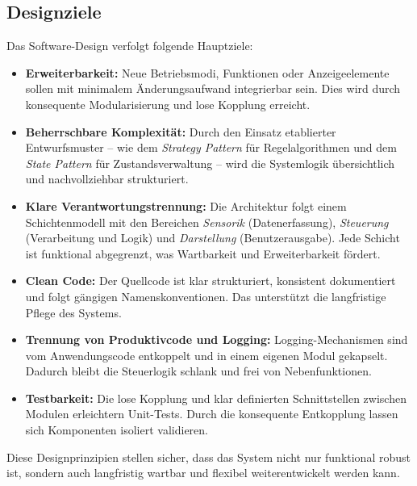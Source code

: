 \documentclass[a4paper,12pt]{article}
\begin{document}
\subsection*{Designziele}

Das Software-Design verfolgt folgende Hauptziele:

\begin{itemize}
    \item \textbf{Erweiterbarkeit:}  
    Neue Betriebsmodi, Funktionen oder Anzeigeelemente sollen mit minimalem Änderungsaufwand integrierbar sein. Dies wird durch konsequente Modularisierung und lose Kopplung erreicht.

    \item \textbf{Beherrschbare Komplexität:}  
    Durch den Einsatz etablierter Entwurfsmuster – wie dem \textit{Strategy Pattern} für Regelalgorithmen und dem \textit{State Pattern} für Zustandsverwaltung – wird die Systemlogik übersichtlich und nachvollziehbar strukturiert.

    \item \textbf{Klare Verantwortungstrennung:}  
    Die Architektur folgt einem Schichtenmodell mit den Bereichen \textit{Sensorik} (Datenerfassung), \textit{Steuerung} (Verarbeitung und Logik) und \textit{Darstellung} (Benutzerausgabe). Jede Schicht ist funktional abgegrenzt, was Wartbarkeit und Erweiterbarkeit fördert.

    \item \textbf{Clean Code:}  
    Der Quellcode ist klar strukturiert, konsistent dokumentiert und folgt gängigen Namenskonventionen. Das unterstützt die langfristige Pflege des Systems.

    \item \textbf{Trennung von Produktivcode und Logging:}  
    Logging-Mechanismen sind vom Anwendungscode entkoppelt und in einem eigenen Modul gekapselt. Dadurch bleibt die Steuerlogik schlank und frei von Nebenfunktionen.

    \item \textbf{Testbarkeit:}  
    Die lose Kopplung und klar definierten Schnittstellen zwischen Modulen erleichtern Unit-Tests. Durch die konsequente Entkopplung lassen sich Komponenten isoliert validieren.
\end{itemize}

Diese Designprinzipien stellen sicher, dass das System nicht nur funktional robust ist, sondern auch langfristig wartbar und flexibel weiterentwickelt werden kann.

\newpage
\end{document}
